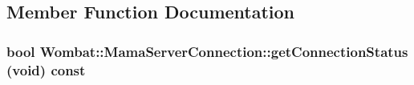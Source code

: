 \subsection{Member Function Documentation}
\hypertarget{classWombat_1_1MamaServerConnection_a4e7aae644962cb04257a51ce0f5b9b3b}{
\subsubsection[{getConnectionStatus}]{\setlength{\rightskip}{0pt plus 5cm}bool Wombat::MamaServerConnection::getConnectionStatus (void) const}}
\label{classWombat_1_1MamaServerConnection_a4e7aae644962cb04257a51ce0f5b9b3b}
